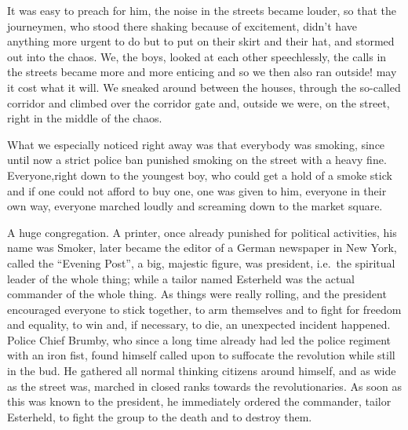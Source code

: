 \documentclass{article}
\begin{document}
It was easy to preach for him, the noise in the streets became louder, so that the journeymen, who stood there shaking because of excitement, didn't have anything more urgent to do but to put on their skirt and their hat, and stormed out into the chaos. We, the boys, looked at each other speechlessly, the calls in the streets became more and more enticing and so we then also ran outside! may it cost what it will. We sneaked around between the houses, through the so-called corridor and climbed over the corridor gate and, outside we were, on the street, right in the middle of the chaos.

What we especially noticed right away was that everybody was smoking, since until now a strict police ban punished smoking on the street with a heavy fine. Everyone,right down to the youngest boy, who could get a hold of a smoke stick and if one could not afford to buy one, one was given to him, everyone in their own way, everyone marched loudly and screaming down to the market square.

A huge congregation. A printer, once already punished for political activities, his name was Smoker, later became the editor of a German newspaper in New York, called the ``Evening Post'', a big, majestic figure, was president, i.e.~the spiritual leader of the whole thing; while a tailor named Esterheld was the actual commander of the whole thing. As things were really rolling, and the president encouraged everyone to stick together, to arm themselves and to fight for freedom and equality, to win and, if necessary, to die, an unexpected incident happened. Police Chief Brumby, who since a long time already had led the police regiment with an iron fist, found himself called upon to suffocate the revolution while still in the bud. He gathered all normal thinking citizens around himself, and as wide as the street was, marched in closed ranks towards the revolutionaries. As soon as this was known to the president, he immediately ordered the commander, tailor Esterheld, to fight the group to the death and to destroy them.
\end{document}

